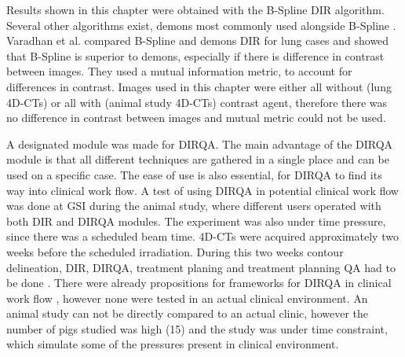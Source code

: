 Results shown in this chapter were obtained with the B-Spline DIR algorithm. Several other algorithms exist, demons most commonly used alongside B-Spline \cite{Thirion1998}. Varadhan et al. compared B-Spline and demons DIR
for lung cases \cite{Varadhan2013} and showed that B-Spline is superior to demons, especially if there is difference in contrast between images. They used a mutual information
metric, to account for differences in contrast. Images used in this chapter were either all without (lung 4D-CTs) or all with (animal study 4D-CTs) contrast agent, therefore there was no difference in contrast
between images and mutual metric could not be used.

A designated module was made for DIRQA. The main advantage of the DIRQA module is that all different techniques are gathered in a single place and can be used on a specific case. 
The ease of use is also essential, for DIRQA to find its way into clinical work flow.
A test of using DIRQA in potential clinical work flow was done at GSI during the animal study, where different users operated with both DIR and DIRQA modules. The experiment was also under time pressure, since there was
a scheduled beam time. 4D-CTs were acquired approximately two weeks before the scheduled irradiation. During this two weeks contour delineation, DIR, DIRQA, treatment planing 
and treatment planning QA had to be done \cite{Lehmann2015}.
There were already propositions for frameworks for DIRQA in clinical work flow \cite{Varadhan2013}, however none were tested in an actual clinical environment. An animal study can not be directly compared to an actual clinic,
however the number of pigs studied was high (15) and the study was under time constraint, which simulate some of the pressures present in clinical environment.

